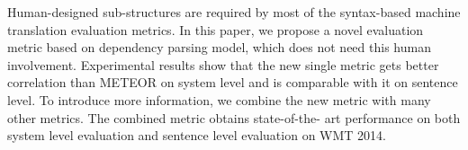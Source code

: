 Human-designed sub-structures are required by most of the syntax-based machine translation evaluation metrics. In this paper, we propose a novel evaluation metric based on dependency parsing model, which does not need this human involvement. Experimental results show that the new single metric gets better correlation than METEOR on system level and is comparable with it on sentence level. To introduce more information, we combine the new metric with many other metrics. The combined metric obtains state-of-the- art performance on both system level evaluation and sentence level evaluation on WMT 2014.
